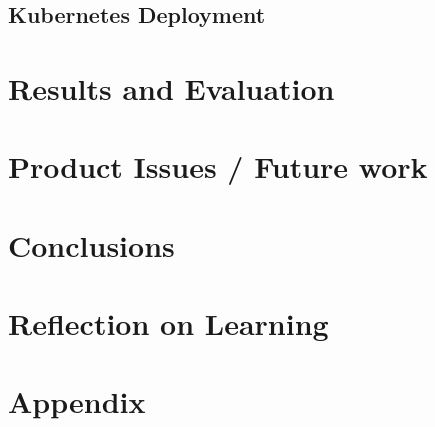 \documentclass[12pt, conference, final, a4paper, onecolumn, compsoc]{IEEEtran}
\begin{document}
\subsection*{Kubernetes Deployment}

\section{Results and Evaluation}
\subsection*{}

\section{Product Issues / Future work} %
\subsection*{}

\section{Conclusions}
\subsection*{}

\section{Reflection on Learning} %
\subsection*{}

\section{Appendix}
%
%
%




 
\end{document}
